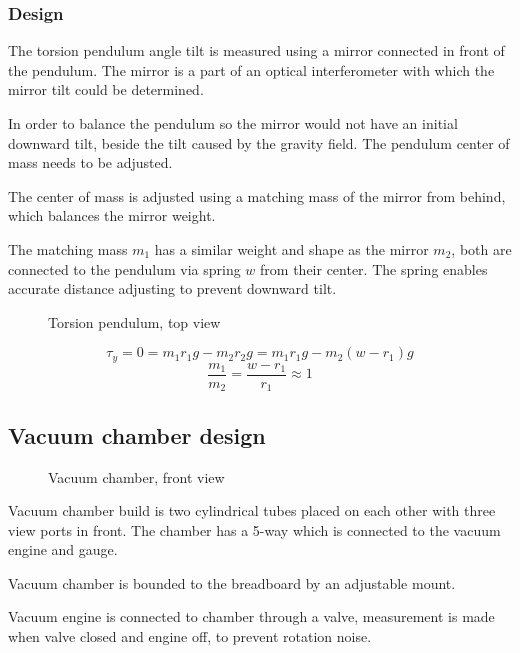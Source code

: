 \documentclass[\main/master.tex]{subfiles}
\begin{document}
\subsubsection{Design}
\par\noindent
The torsion pendulum angle tilt is measured using a mirror connected in front of the pendulum. The mirror is a part of an optical interferometer with which the mirror tilt could be determined.
\par\noindent
In order to balance the pendulum so the mirror would not have an initial downward tilt, beside the tilt caused by the gravity field. The pendulum center of mass needs to be adjusted. 
\par\noindent
The center of mass is adjusted using a matching mass of the mirror from behind, which balances the mirror weight.
\par\noindent
The matching mass $m_1$ has a similar weight and shape as the mirror $m_2$, both are connected to the pendulum via spring $w$ from their center. The spring enables accurate distance adjusting to prevent downward tilt.
\begin{figure}[htbp]
	\centering
	\caption[Torsion pendulum, top view]{Torsion pendulum, top view}
	\label{fig:pendulum top}
\end{figure}
\FloatBarrier 
\begin{equation}
\tau_y = 0 = m_1r_1g-m_2r_2g = m_1r_1g-m_2(w-r_1)g    \label{eqn:downward torque}
\end{equation}
\begin{equation}
\frac{m_1}{m_2} = \frac{w-r_1}{r_1}\approx 1   \label{eqn:downward torque}
\end{equation}


\subsection{Vacuum chamber design}
\begin{figure}[htbp]
	\centering
	\caption[Vacuum chamber, front view]{Vacuum chamber, front view}
	\label{fig:chamber front}
\end{figure}
\FloatBarrier

\par\noindent
Vacuum chamber build is two cylindrical tubes placed on each other with three view ports in front. The chamber has a 5-way which is connected to the vacuum engine and gauge.
\par\noindent
Vacuum chamber is bounded to the breadboard by an adjustable mount.
\par\noindent
Vacuum engine is connected to chamber through a valve, measurement is made when valve closed and engine off, to prevent rotation noise.
\end{document}
